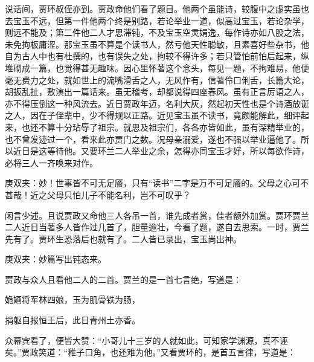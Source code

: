 \begin{parag}
    说话间，贾环叔侄亦到。贾政命他们看了题目。他两个虽能诗，较腹中之虚实虽也去宝玉不远，但第一件他两个终是别路，若论举业一道，似高过宝玉，若论杂学，则远不能及；第二件他二人才思滞钝，不及宝玉空灵娟逸，每作诗亦如八股之法，未免拘板庸涩。那宝玉虽不算是个读书人，然亏他天性聪敏，且素喜好些杂书，他自为古人中也有杜撰的，也有误失之处，拘较不得许多；若只管怕前怕后起来，纵堆砌成一篇，也觉得甚无趣味。因心里怀著这个念头，每见一题，不拘难易，他便毫无费力之处，就如世上的流嘴滑舌之人，无风作有，信著伶口俐舌，长篇大论，胡扳乱扯，敷演出一篇话来。虽无稽考，却都说得四座春风。虽有正言厉语之人，亦不得压倒这一种风流去。近日贾政年迈，名利大灰，然起初天性也是个诗酒放诞之人，因在子侄辈中，少不得规以正路。近见宝玉虽不读书，竟颇能解此，细评起来，也还不算十分玷辱了祖宗。就思及祖宗们，各各亦皆如此，虽有深精举业的，也不曾发迹过一个，看来此亦贾门之数。况母亲溺爱，遂也不强以举业逼他了。所以近日是这等待他。又要环兰二人举业之余，怎得亦同宝玉才好，所以每欲作诗，必将三人一齐唤来对作。\begin{note}庚双夹：妙！世事皆不可无足餍，只有“读书”二字是万不可足餍的。父母之心可不甚哉！近之父母只怕儿子不能名利，岂不可叹乎？\end{note}
\end{parag}


\begin{parag}
    闲言少述。且说贾政又命他三人各吊一首，谁先成者赏，佳者额外加赏。贾环贾兰二人近日当著多人皆作过几首了，胆量逾壮，今看了题，遂自去思索。一时，贾兰先有了。贾环生恐落后也就有了。二人皆已录出，宝玉尚出神。\begin{note}庚双夹：妙篇写出钝态来。\end{note}贾政与众人且看他二人的二首。贾兰的是一首七言绝，写道是：
\end{parag}


\begin{poem}
    \begin{pl}姽婳将军林四娘，玉为肌骨铁为肠，\end{pl}

    \begin{pl}捐躯自报恒王后，此日青州土亦香。\end{pl}
\end{poem}


\begin{parag}
    众幕宾看了，便皆大赞：“小哥儿十三岁的人就如此，可知家学渊源，真不诬矣。”贾政笑道：“稚子口角，也还难为他。”又看贾环的，是首五言律，写道是：
\end{parag}


